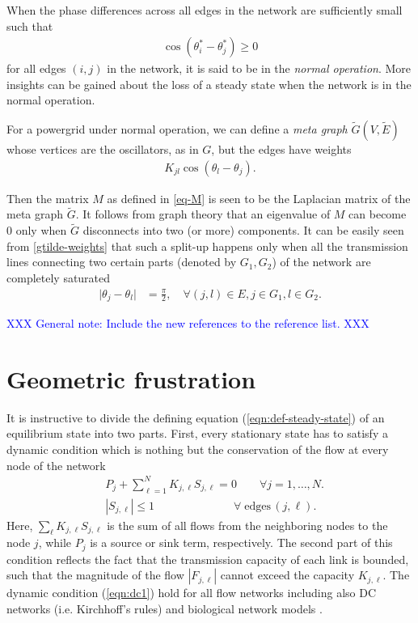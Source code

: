 \documentclass[10pt,aps,pra,onecolumn,superscriptaddress]{revtex4-1}
\newcommand{\dirk}[1]{\textcolor{blue}{#1}}
\newcommand{\abs}[1]{\vert#1\vert}
\begin{document}
When the phase differences across all edges in the network are sufficiently 
small such that
\begin{align}
\label{def:normal-op}
\cos{\left(\theta_i^*-\theta_j^*\right)\ge 0}
\end{align}
for all edges $(i,j)$ in the network, it is said to be in the \emph{normal 
operation}. More insights can be gained about the loss of a steady state when 
the network is in the normal operation.  

For a powergrid under normal operation, we can define a \emph{meta graph} 
$\tilde{G}(V,\tilde{E})$ whose vertices are the oscillators, as in $G$, but the
edges have weights
\begin{align}
\label{gtilde-weights}
K_{jl}\cos\left(\theta_l-\theta_j\right).
\end{align}

Then the matrix $M$ as defined in \eqref{eq-M} is seen to be 
the Laplacian matrix of the meta graph $\tilde{G}$. It follows from graph 
theory that an eigenvalue of $M$ can become $0$ only when $\tilde{G}$ 
disconnects into two (or more) components.  It can be easily seen from 
\eqref{gtilde-weights} that such a split-up happens only when all the 
transmission lines
connecting two certain parts (denoted by $G_1, G_2$) of the network are completely saturated
\begin{align}
\label{}
\abs{\theta_j-\theta_l}&=\frac{\pi}{2},\quad\forall (j,l)\in E, j\in G_1,l\in 
G_2. 
\end{align}

\dirk{XXX General note: Include the new references to the reference list. XXX}

\section{Geometric frustration}
\label{sec:frustration}


It is instructive to divide the defining equation 
(\ref{eqn:def-steady-state}) of an 
equilibrium state into two parts.
First, every stationary state has to satisfy a dynamic condition 
which is nothing but the conservation of the flow at every node
of the network
\begin{subequations}
\label{eqn:dc1}
\begin{align}
   & P_j + \sum_{\ell=1}^N K _{j,\ell} S_{j,\ell} = 0 \qquad 
              \forall j=1,\ldots,N. \\
  &  |S_{j,\ell}|   \le 1 \quad \qquad \qquad \qquad  
              \forall \; \mbox{edges} \, (j,\ell).
\end{align} 
\end{subequations}
Here, $\sum_\ell K_{j,\ell}S_{j,\ell}$ is the sum of all 
flows from the neighboring nodes to the node $j$, while 
$P_j$ is a source or sink term, respectively.
The second part of this condition reflects the fact that the
transmission capacity of each link is bounded, such that the
magnitude of the flow $|F_{j,\ell}|$ cannot exceed the capacity
$K_{j,\ell}$.  
The dynamic condition (\ref{eqn:dc1}) hold for
all flow networks including also DC networks (i.e. Kirchhoff's
rules) and biological network models \cite{Kati10}. 
\end{document}
